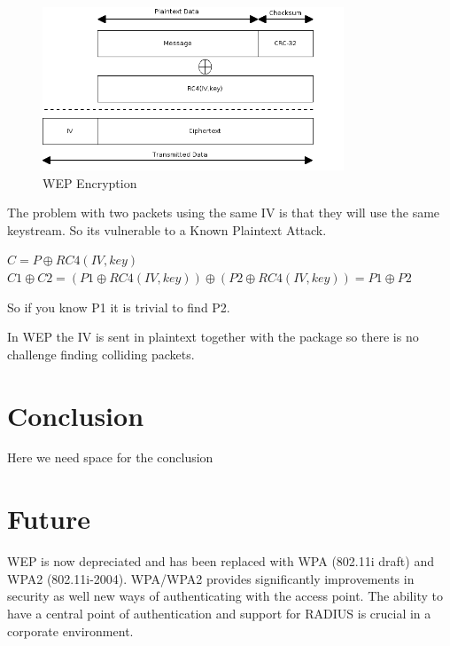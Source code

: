 \documentclass[twocolumn]{IEEEtran}
\begin{document}
\begin{figure}
\includegraphics[width=90mm]{WEP_Encryption.png}
\caption{WEP Encryption}
\end{figure}

The problem with two packets using the same IV is that they will use the same keystream. So its vulnerable to a Known Plaintext Attack.

$C = P \oplus RC4(IV,key)$ \\
$C1 \oplus C2 = (P1 \oplus RC4(IV,key) ) \oplus ( P2 \oplus RC4(IV,key)) = P1 \oplus P2 $

So if you know P1 it is trivial to find P2. 

In WEP the IV is sent in plaintext together with the package so there is no challenge finding colliding packets. 

\section {Conclusion}
\label{sec:conclusion}

Here we need space for the conclusion



\section {Future}
\label{sec:future}

WEP is now depreciated and has been replaced with WPA (802.11i draft) and WPA2 (802.11i-2004). WPA/WPA2 provides significantly improvements in security as well new ways of authenticating with the access point. The ability to have a central point  of authentication and support for RADIUS is crucial in a corporate environment.






\end{document}
